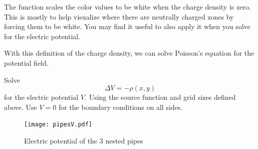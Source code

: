 The function  scales the color values to be white when the charge density is zero.
This is mostly to help visualize where there are neutrally charged zones by forcing them to be white.
You may find it useful to also apply it when you solve for the electric  potential.

With this definition of the charge density, we can solve Poisson's equation for the potential field.

\begin{problem}
Solve 
\[\Delta V = -\rho(x,y)\]
for the electric potential $V.$
Using the source function and grid sizes defined above.
Use $V=0$ for the boundary conditions on all sides.
\end{problem}

\begin{figure}
\texttt{[image: pipesV.pdf]}
\caption{Electric potential of the 3 nested pipes}
\end{figure}